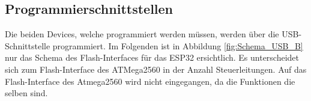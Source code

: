 \clearpage
\subsection{Programmierschnittstellen}
\label{subsec:Programmierschnittstellen}

Die beiden Devices, welche programmiert werden müssen, werden über die USB-Schnittstelle programmiert. Im Folgenden ist in Abbildung \ref{fig:Schema_USB_B} nur das Schema des Flash-Interfaces für das ESP32 ersichtlich. Es unterscheidet sich zum Flash-Interface des ATMega2560 in der Anzahl Steuerleitungen. Auf das Flash-Interface des Atmega2560 wird nicht eingegangen, da die Funktionen die selben sind.